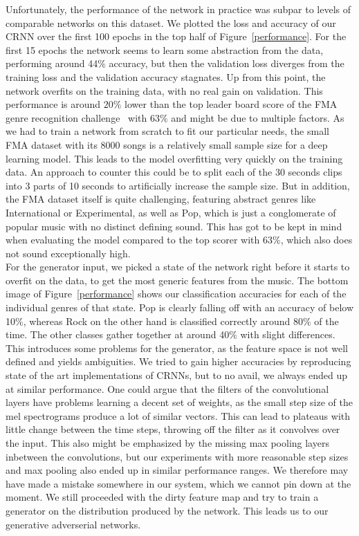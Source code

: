     Unfortunately, the performance of the network in practice was subpar to levels of comparable networks on this dataset.
    We plotted the loss and accuracy of our CRNN over the first 100 epochs in the top half of Figure~\ref{performance}.
    For the first 15 epochs the network seems to learn some abstraction from the data, performing around 44$\%$ accuracy, but then the validation loss diverges from the training loss and the validation accuracy stagnates.
    Up from this point, the network overfits on the training data, with no real gain on validation.
    This performance is around $20\%$ lower than the top leader board score of the FMA genre recognition challenge~\cite{GenreChallenge} with 63$\%$ and might be due to multiple factors.
    As we had to train a network from scratch to fit our particular needs, the small FMA dataset with its 8000 songs is a relatively small sample size for a deep learning model.
    This leads to the model overfitting very quickly on the training data.
    An approach to counter this could be to split each of the 30 seconds clips into 3 parts of 10 seconds to artificially increase the sample size.
    But in addition, the FMA dataset itself is quite challenging, featuring abstract genres like International or Experimental, as well as Pop, which is just a conglomerate of popular music with no distinct defining sound.
    This has got to be kept in mind when evaluating the model compared to the top scorer with 63$\%$, which also does not sound exceptionally high.\\
    For the generator input, we picked a state of the network right before it starts to overfit on the data, to get the most generic features from the music.
    The bottom image of Figure~\ref{performance} shows our classification accuracies for each of the individual genres of that state.
    Pop is clearly falling off with an accuracy of below 10$\%$, whereas Rock on the other hand is classified correctly around 80$\%$ of the time.
    The other classes gather together at around 40$\%$ with slight differences.
    This introduces some problems for the generator, as the feature space is not well defined and yields ambiguities.
    We tried to gain higher accuracies by reproducing state of the art implementations of CRNNs, but to no avail, we always ended up at similar performance.
    One could argue that the filters of the convolutional layers have problems learning a decent set of weights, as the small step size of the mel spectrograms produce a lot of similar vectors.
    This can lead to plateaus with little change between the time steps, throwing off the filter as it convolves over the input.
    This also might be emphasized by the missing max pooling layers inbetween the convolutions, but our experiments with more reasonable step sizes and max pooling also ended up in similar performance ranges.
    We therefore may have made a mistake somewhere in our system, which we cannot pin down at the moment.
    We still proceeded with the dirty feature map and try to train a generator on the distribution produced by the network. This leads us to our generative adverserial networks.